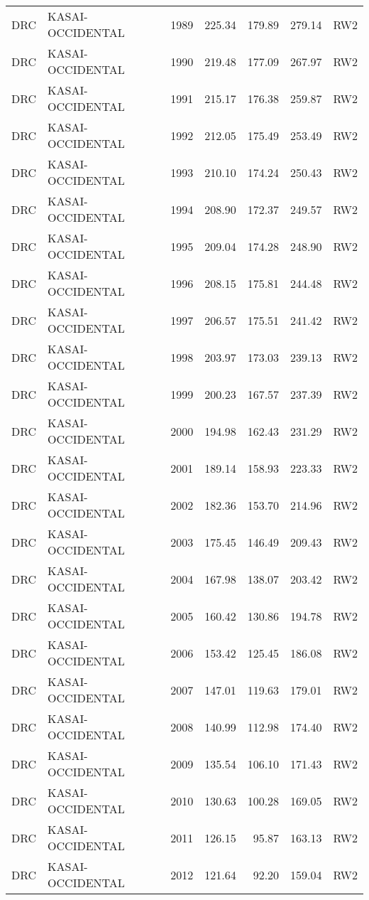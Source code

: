\begin{longtable}{lllrrrl}
  DRC & KASAI-OCCIDENTAL & 1989 & 225.34 & 179.89 & 279.14 & RW2 \\ 
  DRC & KASAI-OCCIDENTAL & 1990 & 219.48 & 177.09 & 267.97 & RW2 \\ 
  DRC & KASAI-OCCIDENTAL & 1991 & 215.17 & 176.38 & 259.87 & RW2 \\ 
  DRC & KASAI-OCCIDENTAL & 1992 & 212.05 & 175.49 & 253.49 & RW2 \\ 
  DRC & KASAI-OCCIDENTAL & 1993 & 210.10 & 174.24 & 250.43 & RW2 \\ 
  DRC & KASAI-OCCIDENTAL & 1994 & 208.90 & 172.37 & 249.57 & RW2 \\ 
  DRC & KASAI-OCCIDENTAL & 1995 & 209.04 & 174.28 & 248.90 & RW2 \\ 
  DRC & KASAI-OCCIDENTAL & 1996 & 208.15 & 175.81 & 244.48 & RW2 \\ 
  DRC & KASAI-OCCIDENTAL & 1997 & 206.57 & 175.51 & 241.42 & RW2 \\ 
  DRC & KASAI-OCCIDENTAL & 1998 & 203.97 & 173.03 & 239.13 & RW2 \\ 
  DRC & KASAI-OCCIDENTAL & 1999 & 200.23 & 167.57 & 237.39 & RW2 \\ 
  DRC & KASAI-OCCIDENTAL & 2000 & 194.98 & 162.43 & 231.29 & RW2 \\ 
  DRC & KASAI-OCCIDENTAL & 2001 & 189.14 & 158.93 & 223.33 & RW2 \\ 
  DRC & KASAI-OCCIDENTAL & 2002 & 182.36 & 153.70 & 214.96 & RW2 \\ 
  DRC & KASAI-OCCIDENTAL & 2003 & 175.45 & 146.49 & 209.43 & RW2 \\ 
  DRC & KASAI-OCCIDENTAL & 2004 & 167.98 & 138.07 & 203.42 & RW2 \\ 
  DRC & KASAI-OCCIDENTAL & 2005 & 160.42 & 130.86 & 194.78 & RW2 \\ 
  DRC & KASAI-OCCIDENTAL & 2006 & 153.42 & 125.45 & 186.08 & RW2 \\ 
  DRC & KASAI-OCCIDENTAL & 2007 & 147.01 & 119.63 & 179.01 & RW2 \\ 
  DRC & KASAI-OCCIDENTAL & 2008 & 140.99 & 112.98 & 174.40 & RW2 \\ 
  DRC & KASAI-OCCIDENTAL & 2009 & 135.54 & 106.10 & 171.43 & RW2 \\ 
  DRC & KASAI-OCCIDENTAL & 2010 & 130.63 & 100.28 & 169.05 & RW2 \\ 
  DRC & KASAI-OCCIDENTAL & 2011 & 126.15 & 95.87 & 163.13 & RW2 \\ 
  DRC & KASAI-OCCIDENTAL & 2012 & 121.64 & 92.20 & 159.04 & RW2 \\ 

\end{longtable}
